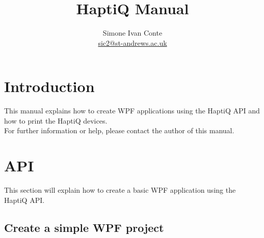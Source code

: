 \documentclass[a4paper]{article}
\title{HaptiQ Manual}
\author{Simone Ivan Conte \\\href{mailto:sic2@st-andrews.ac.uk}{sic2@st-andrews.ac.uk}}
\begin{document}
\maketitle

\newpage

\tableofcontents
\newpage

\section{Introduction}

This manual explains how to create WPF applications using the HaptiQ API and how to print the HaptiQ devices. \\
For further information or help, please contact the author of this manual.

\section{API}

This section will explain how to create a basic WPF application using the HaptiQ API. 

\subsection{Create a simple WPF project}
\end{document}
